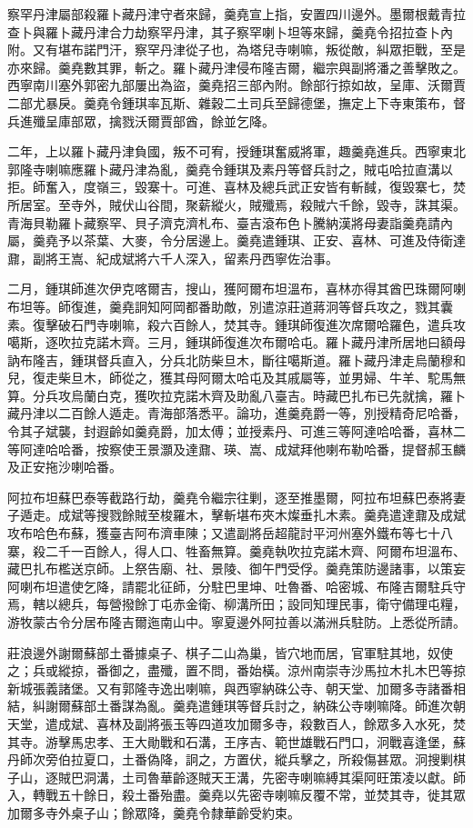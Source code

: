 \begin{pinyinscope}
察罕丹津屬部殺羅卜藏丹津守者來歸，羹堯宣上指，安置四川邊外。墨爾根戴青拉查卜與羅卜藏丹津合力劫察罕丹津，其子察罕喇卜坦等來歸，羹堯令招拉查卜內附。又有堪布諾門汗，察罕丹津從子也，為塔兒寺喇嘛，叛從敵，糾眾拒戰，至是亦來歸。羹堯數其罪，斬之。羅卜藏丹津侵布隆吉爾，繼宗與副將潘之善擊敗之。西寧南川塞外郭密九部屢出為盜，羹堯招三部內附。餘部行掠如故，呈庫、沃爾賈二部尤暴戾。羹堯令鍾琪率瓦斯、雜穀二土司兵至歸德堡，撫定上下寺東策布，督兵進殲呈庫部眾，擒戮沃爾賈部酋，餘並乞降。

二年，上以羅卜藏丹津負國，叛不可宥，授鍾琪奮威將軍，趣羹堯進兵。西寧東北郭隆寺喇嘛應羅卜藏丹津為亂，羹堯令鍾琪及素丹等督兵討之，賊屯哈拉直溝以拒。師奮入，度嶺三，毀寨十。可進、喜林及總兵武正安皆有斬馘，復毀寨七，焚所居室。至寺外，賊伏山谷間，聚薪縱火，賊殲焉，殺賊六千餘，毀寺，誅其渠。青海貝勒羅卜藏察罕、貝子濟克濟札布、臺吉滾布色卜騰納漢將母妻詣羹堯請內屬，羹堯予以茶葉、大麥，令分居邊上。羹堯遣鍾琪、正安、喜林、可進及侍衛達鼐，副將王嵩、紀成斌將六千人深入，留素丹西寧佐治事。

二月，鍾琪師進次伊克喀爾吉，搜山，獲阿爾布坦溫布，喜林亦得其酋巴珠爾阿喇布坦等。師復進，羹堯詗知阿岡都番助敵，別遣涼莊道蔣泂等督兵攻之，戮其囊素。復擊破石門寺喇嘛，殺六百餘人，焚其寺。鍾琪師復進次席爾哈羅色，遣兵攻噶斯，逐吹拉克諾木齊。三月，鍾琪師復進次布爾哈屯。羅卜藏丹津所居地曰額母訥布隆吉，鍾琪督兵直入，分兵北防柴旦木，斷往噶斯道。羅卜藏丹津走烏蘭穆和兒，復走柴旦木，師從之，獲其母阿爾太哈屯及其戚屬等，並男婦、牛羊、駝馬無算。分兵攻烏蘭白克，獲吹拉克諾木齊及助亂八臺吉。時藏巴扎布已先就擒，羅卜藏丹津以二百餘人遁走。青海部落悉平。論功，進羹堯爵一等，別授精奇尼哈番，令其子斌襲，封遐齡如羹堯爵，加太傅；並授素丹、可進三等阿達哈哈番，喜林二等阿達哈哈番，按察使王景灝及達鼐、瑛、嵩、成斌拜他喇布勒哈番，提督郝玉麟及正安拖沙喇哈番。

阿拉布坦蘇巴泰等截路行劫，羹堯令繼宗往剿，逐至推墨爾，阿拉布坦蘇巴泰將妻子遁走。成斌等搜戮餘賊至梭羅木，擊斬堪布夾木燦垂扎木素。羹堯遣達鼐及成斌攻布哈色布蘇，獲臺吉阿布濟車陳；又遣副將岳超龍討平河州塞外鐵布等七十八寨，殺二千一百餘人，得人口、牲畜無算。羹堯執吹拉克諾木齊、阿爾布坦溫布、藏巴扎布檻送京師。上祭告廟、社、景陵、御午門受俘。羹堯策防邊諸事，以策妄阿喇布坦遣使乞降，請罷北征師，分駐巴里坤、吐魯番、哈密城、布隆吉爾駐兵守焉，轄以總兵，每營撥餘丁屯赤金衛、柳溝所田；設同知理民事，衛守備理屯糧，游牧蒙古令分居布隆吉爾迤南山中。寧夏邊外阿拉善以滿洲兵駐防。上悉從所請。

莊浪邊外謝爾蘇部土番據桌子、棋子二山為巢，皆穴地而居，官軍駐其地，奴使之；兵或縱掠，番御之，盡殲，置不問，番始橫。涼州南崇寺沙馬拉木扎木巴等掠新城張義諸堡。又有郭隆寺逸出喇嘛，與西寧納硃公寺、朝天堂、加爾多寺諸番相結，糾謝爾蘇部土番謀為亂。羹堯遣鍾琪等督兵討之，納硃公寺喇嘛降。師進次朝天堂，遣成斌、喜林及副將張玉等四道攻加爾多寺，殺數百人，餘眾多入水死，焚其寺。游擊馬忠孝、王大勛戰和石溝，王序吉、範世雄戰石門口，泂戰喜逢堡，蘇丹師次旁伯拉夏口，土番偽降，詗之，方置伏，縱兵擊之，所殺傷甚眾。泂搜剿棋子山，逐賊巴洞溝，土司魯華齡逐賊天王溝，先密寺喇嘛縛其渠阿旺策凌以獻。師入，轉戰五十餘日，殺土番殆盡。羹堯以先密寺喇嘛反覆不常，並焚其寺，徙其眾加爾多寺外桌子山；餘眾降，羹堯令隸華齡受約束。


\end{pinyinscope}
